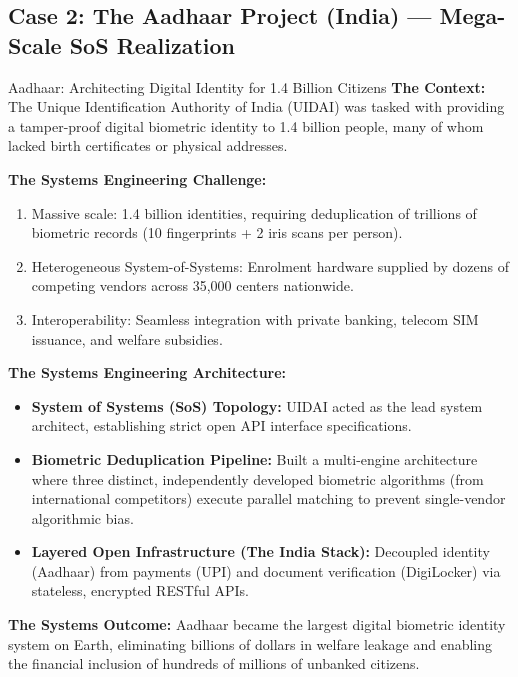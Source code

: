 \subsection{Case 2: The Aadhaar Project (India) --- Mega-Scale SoS Realization}
\begin{storybox}{Aadhaar: Architecting Digital Identity for 1.4 Billion Citizens}
\textbf{The Context:} The Unique Identification Authority of India (UIDAI) was tasked with providing a tamper-proof digital biometric identity to 1.4 billion people, many of whom lacked birth certificates or physical addresses.

\textbf{The Systems Engineering Challenge:}
\begin{enumerate}[label=(\alph*), itemsep=1pt]
    \item Massive scale: 1.4 billion identities, requiring deduplication of trillions of biometric records (10 fingerprints + 2 iris scans per person).
    \item Heterogeneous System-of-Systems: Enrolment hardware supplied by dozens of competing vendors across 35,000 centers nationwide.
    \item Interoperability: Seamless integration with private banking, telecom SIM issuance, and welfare subsidies.
\end{enumerate}

\textbf{The Systems Engineering Architecture:}
\begin{itemize}[leftmargin=1.5em]
    \item \textbf{System of Systems (SoS) Topology:} UIDAI acted as the lead system architect, establishing strict open API interface specifications.
    \item \textbf{Biometric Deduplication Pipeline:} Built a multi-engine architecture where three distinct, independently developed biometric algorithms (from international competitors) execute parallel matching to prevent single-vendor algorithmic bias.
    \item \textbf{Layered Open Infrastructure (The India Stack):} Decoupled identity (Aadhaar) from payments (UPI) and document verification (DigiLocker) via stateless, encrypted RESTful APIs.
\end{itemize}
\textbf{The Systems Outcome:} Aadhaar became the largest digital biometric identity system on Earth, eliminating billions of dollars in welfare leakage and enabling the financial inclusion of hundreds of millions of unbanked citizens.
\end{storybox}

